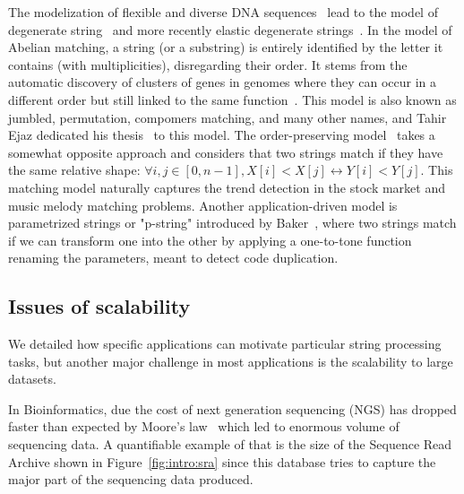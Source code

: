 The modelization of flexible and diverse DNA sequences~\cite{comm1970iupac} lead to the model of degenerate string~\cite{abrahamson1987generalized} and more recently elastic degenerate strings~\cite{iliopoulos2021efficient}.
In the model of Abelian matching, a string (or a substring) is entirely identified by the letter it contains (with multiplicities), disregarding their order. It stems from the automatic discovery of clusters of genes in genomes where they can occur in a different order but still linked to the same function~\cite{eres2004permutation}. This model is also known as jumbled, permutation, compomers matching, and many other names, and Tahir Ejaz dedicated his thesis~\cite{ejaz2010abelian} to this model.
The order-preserving model~\cite{kim2014order,kubica2013linear} takes a somewhat opposite approach and considers that two strings match if they have the same relative shape: $\forall i,j \in [0,n-1], X[i] < X[j] \leftrightarrow Y[i] < Y[j]$. This matching model naturally captures the trend detection in the stock market and music melody matching problems.
%
Another application-driven model is parametrized strings or "p-string" introduced by Baker~\cite{baker1993theory}, where two strings match if we can transform one into the other by applying a one-to-tone function renaming the parameters, meant to detect code duplication.\\

\subsection{Issues of scalability}


We detailed how specific applications can motivate particular string processing tasks, but another major challenge in most applications is the scalability to large datasets.


In Bioinformatics, due the cost of next generation sequencing (NGS) has dropped faster than expected by Moore's law~\cite{muir2016real} which led to enormous volume of sequencing data. A quantifiable example of that is the size of the Sequence Read Archive shown in Figure~\ref{fig:intro:sra} since this database tries to capture the major part of the sequencing data produced.

